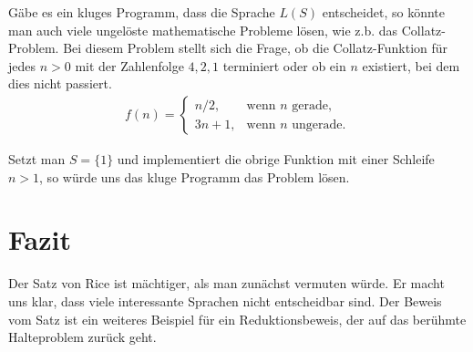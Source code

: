 \documentclass[journal]{IEEEtran}
\begin{document}
Gäbe es ein kluges Programm, dass die Sprache $L(S)$ entscheidet, so könnte man auch viele ungelöste mathematische Probleme lösen, wie z.b. das Collatz-Problem. Bei diesem Problem stellt sich die Frage, ob die Collatz-Funktion für jedes $n > 0$ mit der Zahlenfolge $4, 2, 1$ terminiert oder ob ein $n$ existiert, bei dem dies nicht passiert.
\begin{align*}
  f(n)=\begin{cases}
  n/2,  & \text{wenn }n\text{ gerade,}\\
  3n+1, & \text{wenn }n\text{ ungerade.}
\end{cases}
\end{align*}

Setzt man $S = \{ 1 \}$ und implementiert die obrige Funktion mit einer Schleife $n > 1$, so würde uns das kluge Programm das Problem lösen.

%



\section{Fazit}

Der Satz von Rice ist mächtiger, als man zunächst vermuten würde. Er macht uns klar, dass viele interessante Sprachen nicht entscheidbar sind. Der Beweis vom Satz ist ein weiteres Beispiel für ein Reduktionsbeweis, der auf das berühmte Halteproblem zurück geht.





%
\end{document}
